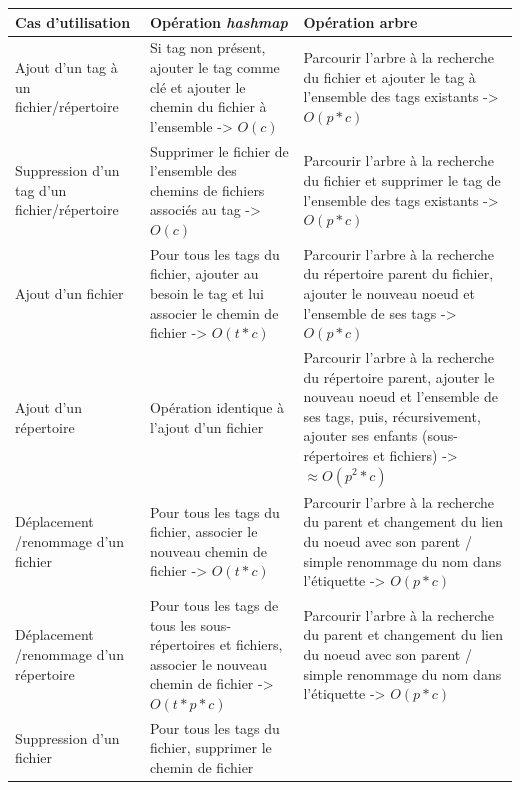 \documentclass[a4paper, 12pt]{article}
\begin{document}
\begin{center}
    \begin{tabularx}{16cm}{|p{3cm}|p{5cm}|X|} \hline
        \textbf{Cas d'utilisation} & \textbf{Opération \textit{hashmap}} & \textbf{Opération arbre} \\ \hline
        Ajout d'un tag à un fichier/répertoire & Si tag non présent, ajouter le tag comme clé et 
            ajouter le chemin du fichier à l'ensemble -> $O(c)$ & Parcourir l'arbre à la recherche 
            du fichier et ajouter le tag à l'ensemble des tags existants -> $O(p * c)$ \\ \hline
        Suppression d'un tag d'un fichier/répertoire & Supprimer le fichier de l'ensemble des 
            chemins de fichiers associés au tag -> $O(c)$ & Parcourir l'arbre à la recherche 
            du fichier et supprimer le tag de l'ensemble des tags existants -> $O(p * c)$ \\ \hline
        Ajout d'un fichier & Pour tous les tags du fichier, ajouter au besoin le tag et lui 
            associer le chemin de fichier -> $O(t * c)$ & Parcourir l'arbre à 
            la recherche du répertoire parent du fichier, ajouter le nouveau noeud et l'ensemble 
            de ses tags -> $O(p * c)$ \\ \hline
        Ajout d'un répertoire & Opération identique à l'ajout d'un fichier & Parcourir l'arbre à 
            la recherche du répertoire parent, ajouter le nouveau noeud et l'ensemble 
            de ses tags, puis, récursivement, ajouter ses enfants (sous-répertoires et fichiers) 
            -> $\approx O(p^2 * c)$ \\ \hline
        Déplacement /renommage d'un fichier & Pour tous les tags du fichier, associer le nouveau 
            chemin de fichier -> $O(t * c)$ & Parcourir l'arbre à la recherche du parent et 
            changement du lien du noeud avec son parent / simple renommage du nom dans 
            l'étiquette -> $O(p * c)$ \\ \hline
        Déplacement /renommage d'un répertoire & Pour tous les tags de tous les 
            sous-répertoires et fichiers, associer le nouveau chemin de fichier -> $O(t * p * c)$ 
            & Parcourir l'arbre à la recherche du parent et changement du lien du noeud avec son 
            parent / simple renommage du nom dans l'étiquette -> $O(p * c)$ \\ \hline
        Suppression d'un fichier & Pour tous les tags du fichier, supprimer le chemin de fichier 

\end{tabularx}
\end{center}
\end{document}
